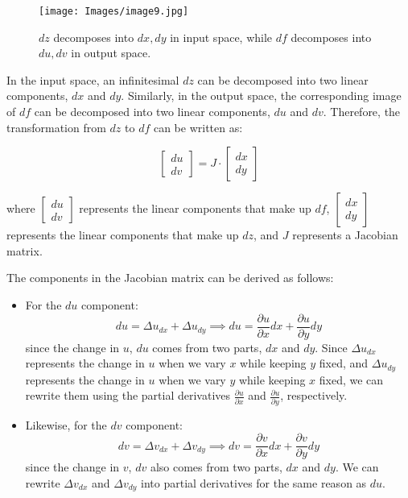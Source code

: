 \documentclass[a4paper,10.5pt]{article}
\begin{document}
\begin{figure}[htp]
    \centering
    \texttt{[image: Images/image9.jpg]}
    \caption{\( dz \) decomposes into \( dx, dy \) in input space, while \( df \) decomposes into \( du, dv \) in output space.}
    \label{fig:galaxy}
\end{figure}

In the input space, an infinitesimal $dz$ can be decomposed into two linear components, $dx$ and $dy$. Similarly, in the output space, the corresponding image of $df$ can be decomposed into two linear components, $du$ and $dv$. Therefore, the transformation from $dz$ to $df$ can be written as:

\begin{equation}
\begin{bmatrix}
du \\
dv
\end{bmatrix} = J \cdot
\begin{bmatrix}
dx \\
dy
\end{bmatrix}
\end{equation}

where \(
\begin{bmatrix}
du \\
dv
\end{bmatrix}
\) represents the linear components that make up $df$, \(
\begin{bmatrix}
dx \\
dy
\end{bmatrix}
\) represents the linear components that make up $dz$, and $J$ represents a Jacobian matrix.

The components in the Jacobian matrix can be derived as follows:

\begin{itemize}
    \item For the $du$ component:
    \begin{equation}
        du = \Delta{u_{dx}}+\Delta{u_{dy}} \implies du = \frac{\partial{u}}{\partial{x}}dx+\frac{{\partial{u}}}{\partial{y}}dy
    \end{equation}
    since the change in $u$, $du$ comes from two parts, $dx$ and $dy$. Since $\Delta{u_{dx}}$ represents the change in $u$ when we vary $x$ while keeping $y$ fixed, and $\Delta{u_{dy}}$ represents the change in $u$ when we vary $y$ while keeping $x$ fixed, we can rewrite them using the partial derivatives $\frac{\partial u}{\partial x}$ and  $\frac{\partial u}{\partial y}$, respectively.
    
    \item Likewise, for the $dv$ component:
    \begin{equation}
        dv = \Delta{v_{dx}}+\Delta{v_{dy}} \implies dv = \frac{\partial{v}}{\partial{x}}dx+\frac{{\partial{v}}}{\partial{y}}dy
    \end{equation}
    since the change in $v$, $dv$ also comes from two parts, $dx$ and $dy$. We can rewrite $\Delta{v_{dx}}$ and $\Delta{v_{dy}}$ into partial derivatives for the same reason as $du$.
\end{itemize}
\end{document}
